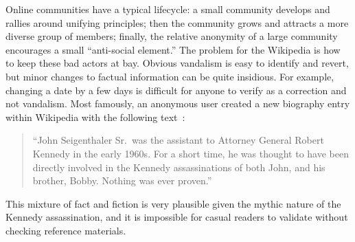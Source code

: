 Online communities have a typical lifecycle:
a small community develops and rallies around unifying principles;
then the community grows and attracts a more diverse group of members;
finally, the relative anonymity of a large community encourages
a small ``anti-social element.''
The problem for the Wikipedia is how to keep these bad actors at bay.
Obvious vandalism is easy to identify and revert,
but minor changes to factual information can be quite insidious.
For example, changing a date by a few days is difficult for anyone
to verify as a correction and not vandalism.
Most famously, an anonymous user created a new biography entry
within Wikipedia with the following
text~\cite{Seigenthaler05,NewYorkTimes05a,NewYorkTimes05b}:
\begin{quote}
``John Seigenthaler Sr.\ was the assistant to
Attorney General Robert Kennedy in the early 1960s.
For a short time, he was thought to have been directly involved
in the Kennedy assassinations of both John, and his brother, Bobby.
Nothing was ever proven.''
\end{quote}
This mixture of fact and fiction is very plausible given the
mythic nature of the Kennedy assassination, and it is impossible
for casual readers to validate without checking reference materials.

